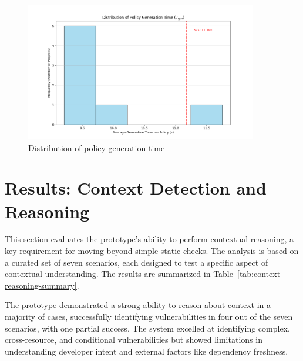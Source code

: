 \begin{figure}[htbp]
	\centering
	\includegraphics[width=0.9\textwidth]{Figures/speed_distribution.png}
	\caption{Distribution of policy generation time}\label{fig:speed-distribution}
\end{figure}

\section{Results: Context Detection and Reasoning}\label{sec:results-context}

This section evaluates the prototype's ability to perform contextual reasoning, a key requirement for moving beyond simple static checks. The analysis is based on a curated set of seven scenarios, each designed to test a specific aspect of contextual understanding. The results are summarized in Table~\ref{tab:context-reasoning-summary}.

The prototype demonstrated a strong ability to reason about context in a majority of cases, successfully identifying vulnerabilities in four out of the seven scenarios, with one partial success. The system excelled at identifying complex, cross-resource, and conditional vulnerabilities but showed limitations in understanding developer intent and external factors like dependency freshness.

